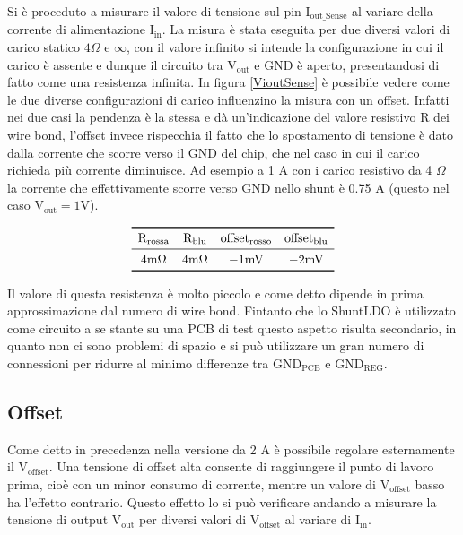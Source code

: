 Si è proceduto a misurare il valore di tensione sul pin $\mathrm{I_{out{\_}Sense}}$ al variare della corrente di alimentazione $\mathrm{I_{in}}$. 
La misura è stata eseguita per due diversi valori di carico statico $4 \Omega$ e $\infty$, con il valore infinito si intende la configurazione in cui il carico è assente e dunque il circuito tra $\mathrm{V_{out}}$ e GND è aperto, presentandosi di fatto come una resistenza infinita. 
In figura \ref{VioutSense} è possibile vedere come le due diverse configurazioni di carico influenzino la misura con un offset. 
Infatti nei due casi la pendenza è la stessa e dà un'indicazione del valore resistivo R dei wire bond, l'offset invece rispecchia il fatto che lo spostamento di tensione è dato dalla corrente che scorre verso il GND del chip, che nel caso in cui il carico richieda più corrente diminuisce. Ad esempio a 1 A con i carico resistivo da 4 $\Omega$ la corrente che effettivamente scorre verso GND nello shunt è 0.75 A (questo nel caso $\mathrm{V_{out} = 1 V}$).

\[
\begin{array}{cccc}

\toprule
\mathrm{R_{rossa}}  & \mathrm{R_{blu}} & \mathrm{offset_{rosso}} & \mathrm{offset_{blu}} \\

\midrule

\mathrm{4 m} \Omega & \mathrm{4 m}\Omega & \mathrm{-1 mV}  & \mathrm{-2 mV} \\

\bottomrule
\end{array}
\]

Il valore di questa resistenza è molto piccolo e come detto dipende in prima approssimazione dal numero di wire bond. Fintanto che lo ShuntLDO è utilizzato come circuito a se stante su una PCB di test questo aspetto risulta secondario, in quanto non ci sono problemi di spazio e si può utilizzare un gran numero di connessioni per ridurre al minimo differenze tra $\mathrm{GND_{PCB}}$ e $\mathrm{GND_{REG}}$.   

  
\subsection{Offset}
Come detto in precedenza nella versione da 2 A è possibile regolare esternamente il $\mathrm{V_{offset}}$. 
Una tensione di offset alta consente di raggiungere il punto di lavoro prima, cioè con un minor consumo di corrente, mentre un valore di $\mathrm{V_{offset}}$ basso ha l'effetto contrario. Questo effetto lo si può verificare andando a misurare la tensione di output $\mathrm{V_{out}}$ per diversi valori di $\mathrm{V_{offset}}$ al variare di $\mathrm{I_{in}}$.

